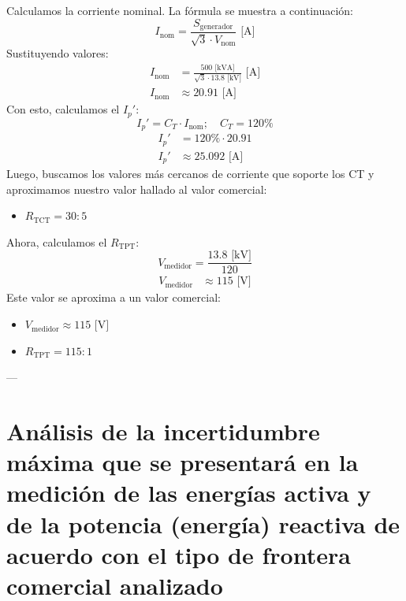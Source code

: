 Calculamos la corriente nominal. La fórmula se muestra a continuación:
\begin{equation}
    I_{\text{nom}} = \frac{S_{\text{generador}}}{\sqrt{3} \cdot V_{\text{nom}}} \text{ [A]}
\end{equation}
Sustituyendo valores:
\begin{align*}
    I_{\text{nom}} &= \frac{500 \text{ [kVA]}}{\sqrt{3} \cdot 13.8 \text{ [kV]}} \text{ [A]} \\
    I_{\text{nom}} &\approx 20.91 \text{ [A]}
\end{align*}
Con esto, calculamos el $I_{p}'$:
\begin{equation}
    I_{p}' = C_T \cdot I_{\text{nom}} ; \quad C_T = 120\%
\end{equation}
\begin{align*}
    I_{p}' &= 120\% \cdot 20.91 \\
    I_{p}' &\approx 25.092 \text{ [A]}
\end{align*}
Luego, buscamos los valores más cercanos de corriente que soporte los CT y aproximamos nuestro valor hallado al valor comercial:
\begin{itemize}
    \item $R_{\text{TCT}} = 30:5$
\end{itemize}
Ahora, calculamos el $R_{\text{TPT}}$:
\begin{equation}
    V_{\text{medidor}} = \frac{13.8 \text{ [kV]}}{120}
\end{equation}
\begin{align*}
    V_{\text{medidor}} &\approx 115 \text{ [V]}
\end{align*}
Este valor se aproxima a un valor comercial:
\begin{itemize}
    \item $V_{\text{medidor}} \approx 115 \text{ [V]}$
    \item $R_{\text{TPT}} = 115:1$
\end{itemize}

---
\section{Análisis de la incertidumbre máxima que se presentará en la medición de las energías activa y de la potencia (energía) reactiva de acuerdo con el tipo de frontera comercial analizado}

